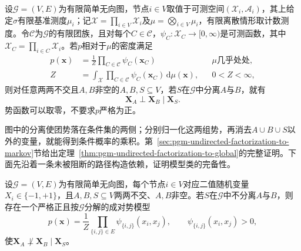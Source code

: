 \begin{theorem}[团因子分解分布上的分离可靠性]
  \label{thm:pgm-undirected-factorization-to-global}
  设$\mathcal{G}=(V,E)$为有限简单无向图，节点$i\in V$取值于可测空间$(\mathcal{X}_i,\mathcal{A}_i)$，其上给定$\sigma$有限基准测度$\mu_i$；记$\mathcal{X}=\prod_{i\in V}\mathcal{X}_i$及$\mu=\bigotimes_{i\in V}\mu_i$，有限离散情形取计数测度。令$\mathcal{C}$为$\mathcal{G}$的有限团族，且对每个$C\in\mathcal{C}$，$\psi_C:\mathcal{X}_C\to[0,\infty)$是可测函数，其中$\mathcal{X}_C=\prod_{i\in C}\mathcal{X}_i$。若$p$相对于$\mu$的密度满足
  \[
    \begin{aligned}
      p(\bm{x})
      &=\frac{1}{Z}\prod_{C\in\mathcal{C}}\psi_C(\bm{x}_C)
        &&\text{$\mu$几乎处处},\\
      Z
      &=\int_{\mathcal{X}}\prod_{C\in\mathcal{C}}
        \psi_C(\bm{x}_C)\,\mathrm{d}\mu(\bm{x}),
        &&0<Z<\infty,
    \end{aligned}
  \]
  则对任意两两不交且$A,B$非空的$A,B,S\subseteq V$，若$S$在$\mathcal{G}$中分离$A$与$B$，就有
  \[
    \bm{X}_A\perp\bm{X}_B\mid\bm{X}_S.
  \]
  势函数可以取零，不要求$p$严格为正。
\end{theorem}

图中的分离使团势落在条件集的两侧；分别归一化这两组势，再消去$A\cup B\cup S$以外的变量，就能得到条件概率的乘积。第~\ref{sec:pgm-undirected-factorization-to-markov}节给出定理~\ref{thm:pgm-undirected-factorization-to-global}的完整证明。下面先沿着一条未被阻断的路径构造依赖，证明模型类的完备性。

\begin{theorem}[严格正二值成对势模型类中的分离完备性]
  \label{thm:pgm-undirected-separation-completeness}
  设$\mathcal{G}=(V,E)$为有限简单无向图，每个节点$i\in V$对应二值随机变量$X_i\in\{-1,+1\}$，且$A,B,S\subseteq V$两两不交、$A,B$非空。若$S$在$\mathcal{G}$中不分离$A$与$B$，则存在一个严格正且按$\mathcal{G}$分解的成对势模型
  \[
    p(\bm{x})=\frac{1}{Z}
      \prod_{\{i,j\}\in E}\psi_{\{i,j\}}(x_i,x_j),
    \qquad \psi_{\{i,j\}}(x_i,x_j)>0,
  \]
  使$\bm{X}_A\not\perp\bm{X}_B\mid\bm{X}_S$。
\end{theorem}

